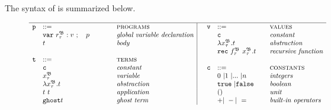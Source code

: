 \renewcommand{\arraystretch}{1.1}
The syntax of \glam is summarized below.\vspace{-0.5cm}
\begin{figure}[H]
\begin{displaymath}
 \begin{array}{ll@{\hspace*{-0.1cm}}l@{\hspace*{1.5cm} }l|@{\hspace*{0.5cm}}llll}
 \hline
  
   \texttt{p} & ::= &  & \textsc{programs} &  
   \texttt{v} & ::= &  & \textsc{values}   						   \\
 
 
   	&  \mathtt{var}~ \gvar{r}{}{} : v~; \quad p       
   	& & \textit{global variable declaration} &
	&      \texttt{c}             & & \textit{constant}            \\ 
 
 
   	&     t & & \textit{body} &
	&     \gabst{x}{}{}{t}        & & \textit{abstraction}         \\    


	&  &  &   &	 & \mathtt{rec} ~ \gvar{f}{}{} ~ \gvar{x}{}{}. t    
   								  & &  \textit{recursive function} \\ 
 
   \texttt{t} & ::= &  & \textsc{terms} &  
    &  &  &   						                               \\
   
   
   	&     \texttt{c}              & & \textit{constant} &
	\texttt{c} & ::= &  & \textsc{constants}                       \\
   	
   	
   	&     x^{\mathfrak{B}}_{\tau} & & \textit{variable} &
	&     0 ~| 1 ~| ... ~| n        & & \textit{integers}          \\   	
  
  
   	&    \gabst{x}{}{}{t}         & & \textit{abstraction} &   	
   	&   \mathtt{true}~|\mathtt{false} & & \textit{boolean}         \\
     
     
   	&    t~t    &                  & \textit{application} &
   	&    ()                           & & \textit{unit}            \\
   	
   	
   	&   \mathtt{ghost} t  &  & \textit{ghost term} &  
    &     +|~-|~=        & & \textit{built-in operators}           \\ 
  	

\end{array}
\end{displaymath}
\end{figure}
